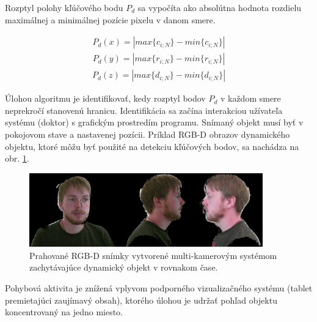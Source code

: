 \noindent Rozptyl polohy kľúčového bodu $P_d$ sa vypočíta ako absolútna hodnota rozdielu maximálnej a minimálnej pozície pixelu v danom smere. 

\begin{equation}
\label{eq:pixels:d}
\begin{aligned}
P_d\left(x\right)=\left|  max\lbrace c_{i;N} \rbrace -min\lbrace c_{i;N} \rbrace \right| 
\end{aligned}
\end{equation}
\begin{equation}
\label{eq:pixels:e}
\begin{aligned}
P_d\left(y\right)=\left|  max\lbrace r_{i;N} \rbrace -min\lbrace r_{i;N} \rbrace \right| 
\end{aligned}
\end{equation}
\begin{equation}
\label{eq:pixels:f}
\begin{aligned}
P_d\left(z\right)=\left|  max\lbrace d_{i;N} \rbrace -min\lbrace d_{i;N} \rbrace \right| 
\end{aligned}
\end{equation}

Úlohou algoritmu je identifikovať, kedy rozptyl bodov $P_d$ v každom smere neprekročí stanovenú hranicu. Identifikácia sa začína interakciou užívateľa systému (doktor) s grafickým prostredím programu. Snímaný objekt musí byť v pokojovom stave a nastavenej pozícii. Príklad RGB-D obrazov dynamického objektu, ktoré môžu byť použité na detekciu kľúčových bodov, sa nachádza na obr. \ref{fig:dlib:views}. 

\begin{figure}[H]
	\centering
	\includegraphics[width=0.9\textwidth]{figures/rgbd_views.png}
	\caption{Prahované RGB-D snímky vytvorené multi-kamerovým systémom zachytávajúce dynamický objekt v rovnakom čase.}
	\label{fig:dlib:views}
\end{figure}

Pohybová aktivita je znížená vplyvom podporného vizualizačného systému (tablet premietajúci zaujímavý obsah), ktorého úlohou je udržať pohľad objektu koncentrovaný na jedno miesto.

